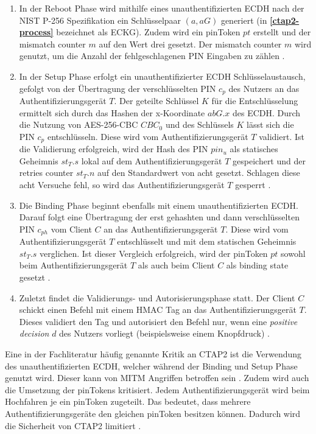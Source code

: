 \begin{enumerate}
    \item In der Reboot Phase wird mithilfe eines unauthentifizierten \ac{ECDH} nach der NIST P-256 Spezifikation ein Schlüsselpaar $(a, aG)$ generiert (in \textbf{\ref{ctap2-process}} bezeichnet als ECKG). Zudem wird ein pinToken $pt$ erstellt und der mismatch counter $m$ auf den Wert drei gesetzt. Der mismatch counter $m$ wird genutzt, um die Anzahl der fehlgeschlagenen PIN Eingaben zu zählen \cite{barbosa2021provable}.  
    \item In der Setup Phase erfolgt ein unauthentifizierter \ac{ECDH} Schlüsselaustausch, gefolgt von der Übertragung der verschlüsselten PIN $c_p$ des Nutzers an das Authentifizierungsgerät $T$. Der geteilte Schlüssel $K$ für die Entschlüsselung ermittelt sich durch das Hashen der x-Koordinate $abG.x$ des \ac{ECDH}. Durch die Nutzung von AES-256-CBC $CBC_0$ und des Schlüssels $K$ lässt sich die PIN $c_p$ entschlüsseln. Diese wird vom Authentifizierungsgerät $T$ validiert. Ist die Validierung erfolgreich, wird der Hash des PIN $pin_u$ als statisches Geheimnis $st_T.s$ lokal auf dem Authentifizierungsgerät $T$ gespeichert und der retries counter $st_T.n$ auf den Standardwert von acht gesetzt. Schlagen diese acht Versuche fehl, so wird das Authentifizierungsgerät $T$ gesperrt \cite{barbosa2021provable} \cite{bindel2022fido2}.
    \item Die Binding Phase beginnt ebenfalls mit einem unauthentifizierten \ac{ECDH}. Darauf folgt eine Übertragung der erst gehashten und dann verschlüsselten PIN $c_{ph}$ vom Client $C$ an das Authentifizierungsgerät $T$. Diese wird vom Authentifizierungsgerät $T$ entschlüsselt und mit dem statischen Geheimnis $st_T.s$ verglichen. Ist dieser Vergleich erfolgreich, wird der pinToken $pt$ sowohl beim Authentifizierungsgerät $T$ als auch beim Client $C$ als binding state gesetzt \cite{barbosa2021provable} \cite{bindel2022fido2}.
    \item Zuletzt findet die Validierungs- und Autorisierungsphase statt. Der Client $C$ schickt einen Befehl mit einem HMAC Tag an das Authentifizierungsgerät $T$. Dieses validiert den Tag und autorisiert den Befehl nur, wenn eine \textit{positive decision} $d$ des Nutzers vorliegt (beispielsweise einem Knopfdruck) \cite{barbosa2021provable} \cite{bindel2022fido2}.
\end{enumerate}

Eine in der Fachliteratur häufig genannte Kritik an \ac{CTAP2} ist die Verwendung des unauthentifizierten \ac{ECDH}, welcher während der Binding und Setup Phase genutzt wird. Dieser kann von \ac{MITM} Angriffen betroffen sein \cite{barbosa2021provable}.
Zudem wird auch die Umsetzung der pinTokens kritisiert. Jedem Authentifizierungsgerät wird beim Hochfahren je ein pinToken zugeteilt. Das bedeutet, dass mehrere Authentifizierungsgeräte den gleichen pinToken besitzen können. Dadurch wird die Sicherheit von \ac{CTAP2} limitiert \cite{barbosa2021provable}.

